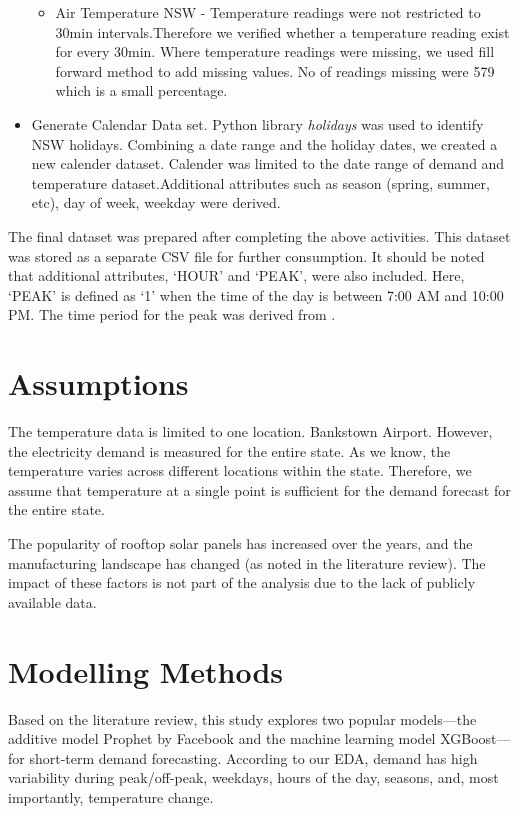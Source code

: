 \documentclass[mstat,12pt]{unswthesis}
\begin{document}
\begin{itemize}
\begin{itemize}
      \item Air Temperature NSW - Temperature readings were not restricted to 30min intervals.Therefore we verified whether a temperature reading exist for every 30min. Where temperature readings were missing, we used fill forward method to add missing values. No of readings missing were 579 which is a small percentage.
    \end{itemize}
  \item Generate Calendar Data set. Python library \textit{holidays} was used to identify NSW holidays. Combining a date range and the holiday dates, we created a new calender dataset. Calender was limited to the date range of demand and temperature dataset.Additional attributes such as season (spring, summer, etc), day of week, weekday were derived.
\end{itemize}

The final dataset was prepared after completing the above activities.
This dataset was stored as a separate CSV file for further consumption.
It should be noted that additional attributes, `HOUR' and `PEAK', were
also included. Here, `PEAK' is defined as `1' when the time of the day
is between 7:00 AM and 10:00 PM. The time period for the peak was
derived from \cite{canstarblue_peakoffpeak}.

\hypertarget{assumptions}{%
\section{Assumptions}\label{assumptions}}

The temperature data is limited to one location. Bankstown Airport.
However, the electricity demand is measured for the entire state. As we
know, the temperature varies across different locations within the
state. Therefore, we assume that temperature at a single point is
sufficient for the demand forecast for the entire state.

The popularity of rooftop solar panels has increased over the years, and
the manufacturing landscape has changed (as noted in the literature
review). The impact of these factors is not part of the analysis due to
the lack of publicly available data.

\hypertarget{modelling-methods}{%
\section{Modelling Methods}\label{modelling-methods}}

Based on the literature review, this study explores two popular
models---the additive model Prophet by Facebook and the machine learning
model XGBoost---for short-term demand forecasting. According to our EDA,
demand has high variability during peak/off-peak, weekdays, hours of the
day, seasons, and, most importantly, temperature change.
\end{document}
